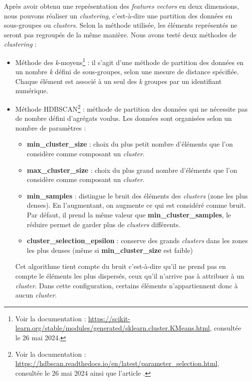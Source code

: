 Après avoir obtenu une représentation des \textit{features vectors} en deux dimensions, nous pouvons réaliser un \textit{clustering}, c'est-à-dire une partition des données en sous-groupes ou \textit{clusters}. Selon la méthode utilisée, les éléments représentés ne seront pas regroupés de la même manière. Nous avons testé deux méthodes de \textit{clustering} : 
\begin{itemize}
	\item Méthode des \textit{k}-moyens\footnote{Voir la documentation : \url{https://scikit-learn.org/stable/modules/generated/sklearn.cluster.KMeans.html}, consultée le 26 mai 2024.} : il s'agit d'une méthode de partition des données en un nombre \textit{k} défini de sous-groupes, selon une mesure de distance spécifiée. Chaque élément est associé à un seul des \textit{k} groupes par un identifiant numérique.
	\item Méthode HDBSCAN\footnote{Voir la documentation : \url{https://hdbscan.readthedocs.io/en/latest/parameter_selection.html}, consultée le 26 mai 2024 ainsi que l'article \cite{mcinnesHdbscanHierarchicalDensity2017}.} : méthode de partition des données qui ne nécessite pas de nombre défini d'agrégats voulus. Les données sont organisées selon un nombre de paramètres : 
	\begin{itemize}
		\item \textbf{min\_cluster\_size} : choix du plus petit nombre d'éléments que l'on considère comme composant un \textit{cluster}.
		\item \textbf{max\_cluster\_size} : choix du plus grand nombre d'éléments que l'on considère comme composant un \textit{cluster}.
		\item \textbf{min\_samples} : distingue le bruit des éléments des \textit{clusters} (zone les plus denses). En l'augmentant, on augmente ce qui est considéré comme bruit. Par défaut, il prend la même valeur que \textbf{min\_cluster\_samples}, le réduire permet de garder plus de \textit{clusters} différents.
		\item \textbf{cluster\_selection\_epsilon} : conserve des grands \textit{clusters} dans les zones les plus denses (même si \textbf{min\_cluster\_size} est faible)
	\end{itemize}
Cet algorithme tient compte du bruit c'est-à-dire qu'il ne prend pas en compte le éléments les plus dispersés, ceux qu'il n'arrive pas à attribuer à un \textit{cluster}. Dans cette configuration, certains éléments n'appartiennent donc à aucun \textit{cluster}. \\
\end{itemize}

